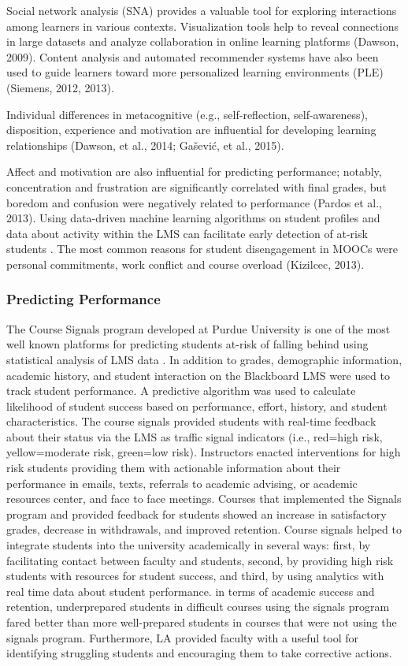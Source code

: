 \documentclass[sigconf]{acmart}
\begin{document}
Social network analysis 
(SNA) provides a valuable tool for exploring interactions among learners in 
various contexts. Visualization tools help to reveal connections in large 
datasets and analyze collaboration in online learning platforms (Dawson, 2009). 
Content analysis and automated recommender systems have also been used to guide 
learners toward more personalized learning environments (PLE) (Siemens, 2012, 2013). 

Individual differences in metacognitive (e.g., self-reflection, self-awareness), 
disposition, experience and motivation are influential for developing learning 
relationships (Dawson, et al., 2014; Gašević, et al., 2015). 

Affect and motivation are also 
influential for predicting performance; notably, concentration and 
frustration are significantly correlated with final grades, but boredom and 
confusion were negatively related to performance (Pardos et al., 2013). 
Using data-driven machine learning algorithms on student profiles and data 
about activity within the LMS can facilitate early detection of at-risk 
students \cite{Dekkar09}.  The most 
common reasons for  student disengagement in MOOCs were personal commitments, 
work conflict and course overload (Kizilcec, 2013). 

\subsubsection{Predicting Performance} 

The Course Signals program developed at Purdue University 
is one of the most well known platforms for predicting students at-risk of 
falling behind using statistical analysis of LMS data \cite{arnoldPistilli12}. 
In addition to grades, demographic information, academic history, and student 
interaction on the Blackboard LMS were used to track student performance. A 
predictive algorithm was used to calculate likelihood of student success based 
on performance, effort, history, and student characteristics. The course signals 
provided students with real-time feedback about their status via the LMS as 
traffic signal indicators (i.e., red=high risk, yellow=moderate risk, green=low 
risk). Instructors enacted interventions for high risk students providing them 
with actionable information about their performance in emails, texts, referrals
to academic advising, or academic resources center, and face to face meetings.
Courses that implemented the Signals program and provided feedback for students
showed an increase in satisfactory grades, decrease in withdrawals, and 
improved retention. Course signals helped to integrate students into the 
university academically in several ways: first, by facilitating contact 
between faculty and students, second, by providing high risk students with 
resources for student success, and third, by using analytics with real time 
data about student performance. in terms of academic success and retention, 
underprepared students in difficult courses using the signals program fared 
better than more well-prepared students in courses that were not using the 
signals program. Furthermore, LA provided faculty with a useful tool for 
identifying struggling students and encouraging them to take corrective actions.  
\end{document}

